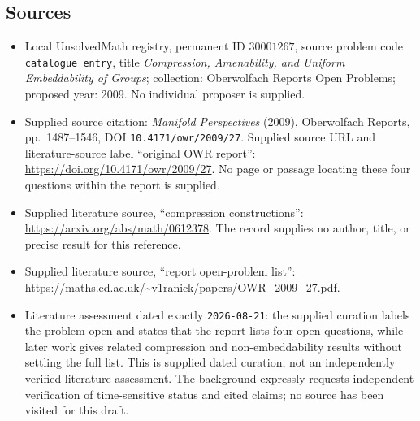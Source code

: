 \documentclass[11pt]{article}
\begin{document}
\subsection{Sources}
\begin{itemize}
\item Local UnsolvedMath registry, permanent ID \(30001267\), source problem code \texttt{catalogue entry}, title \emph{Compression, Amenability, and Uniform Embeddability of Groups}; collection: Oberwolfach Reports Open Problems; proposed year: 2009. No individual proposer is supplied.
\item Supplied source citation: \emph{Manifold Perspectives} (2009), Oberwolfach Reports, pp.\ 1487--1546, DOI \texttt{10.4171/owr/2009/27}. Supplied source URL and literature-source label ``original OWR report'': \url{https://doi.org/10.4171/owr/2009/27}. No page or passage locating these four questions within the report is supplied.
\item Supplied literature source, ``compression constructions'': \url{https://arxiv.org/abs/math/0612378}. The record supplies no author, title, or precise result for this reference.
\item Supplied literature source, ``report open-problem list'': \url{https://maths.ed.ac.uk/~v1ranick/papers/OWR_2009_27.pdf}.
\item Literature assessment dated exactly \texttt{2026-08-21}: the supplied curation labels the problem open and states that the report lists four open questions, while later work gives related compression and non-embeddability results without settling the full list. This is supplied dated curation, not an independently verified literature assessment. The background expressly requests independent verification of time-sensitive status and cited claims; no source has been visited for this draft.
\end{itemize}
\end{document}
